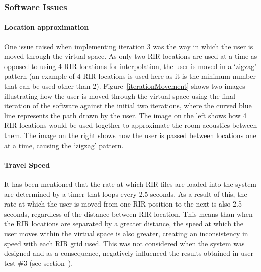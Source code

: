 \documentclass[../../main.tex]{subfiles}
\begin{document}
		\subsubsection{Software Issues}
	\label{iteration3Issues}

		\paragraph{Location approximation}
		One issue raised when implementing iteration 3 was the way in which the user is moved through the virtual space. As only two \ac{RIR} locations are used at a time as opposed to using 4 \ac{RIR} locations for interpolation, the user is moved in a `zigzag' pattern (an example of 4 \ac{RIR} locations is used here as it is the minimum number that can be used other than 2). Figure~\ref{iterationMovement} shows two images illustrating how the user is moved through the virtual space using the final iteration of the software against the initial two iterations, where the curved blue line represents the path drawn by the user. The image on the left shows how 4 \ac{RIR} locations would be used together to approximate the room acoustics between them. The image on the right shows how the user is passed between locations one at a time, causing the `zigzag' pattern.

		\paragraph{Travel Speed}

		It has been mentioned that the rate at which \ac{RIR} files are loaded into the system are determined by a timer that loops every 2.5 seconds. As a result of this, the rate at which the user is moved from one \ac{RIR} position to the next is also 2.5 seconds, regardless of the distance between \ac{RIR} location. This means than when the \ac{RIR} locations are separated by a greater distance, the speed at which the user moves within the virtual space is also greater, creating an inconsistency in speed with each \ac{RIR} grid used. This was not considered when the system was designed and as a consequence, negatively influenced the results obtained in user test \#3 (see section~).
\end{document}

